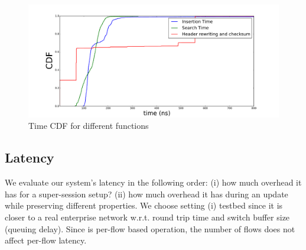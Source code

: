 \begin{figure}[ht]
\centering
\includegraphics[width=\linewidth]{figures/cdf.pdf} 
\caption{\small Time CDF for different functions}\label{microbenchmark}
\end{figure}
% 






\subsection{Latency}

We evaluate our system's latency in the  following order: (i) how much
overhead it has  for a super-session setup? (ii)  how much overhead it
has during an update while preserving  different properties. We choose
setting (i) testbed  since it is closer to  a real  enterprise network
w.r.t.  round trip time and switch  buffer size (queuing delay). Since
\system  is  per-flow based  operation, the number  of flows  does not
affect per-flow latency.


